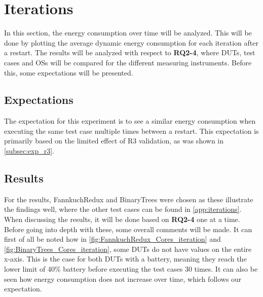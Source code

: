 \section{Iterations}\label{sec:iterations}

In this section, the energy consumption over time will be analyzed. This will be done by plotting the average dynamic energy consumption for each iteration after a restart. The results will be analyzed with respect to \textbf{RQ2-4}, where DUTs, test cases and OSs will be compared for the different measuring instruments. Before this, some expectations will be presented.

\subsection{Expectations}

The expectation for this experiment is to see a similar energy consumption when executing the same test case multiple times between a restart. This expectation is primarily based on the limited effect of R3 validation, as was shown in \cref{subsec:exp_r3}.

\subsection{Results}

For the results, FannkuchRedux and BinaryTrees were chosen as these illustrate the findings well, where the other test cases can be found in \cref{app:iterations}. When discussing the results, it will be done based on \textbf{RQ2-4} one at a time. Before going into depth with these, some overall comments will be made. It can first of all be noted how in \cref{fig:FannkuchRedux_Cores_iteration} and \cref{fig:BinaryTrees_Cores_iteration}, some DUTs do not have values on the entire x-axis. This is the case for both DUTs with a battery, meaning they reach the lower limit of 40\% battery before executing the test cases 30 times. It can also be seen how energy consumption does not increase over time, which follows our expectation. 



